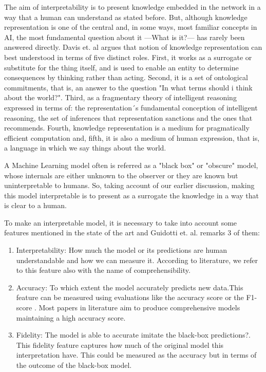 \documentclass[runningheads]{llncs}
\begin{document}
The aim of interpretability is to present knowledge embedded in the network in a way that a human can understand as stated before. But, although knowledge representation is one of the central and, in some ways, most familiar concepts in AI, the most fundamental question about it —What is it?— has rarely been answered directly. Davis et. al \cite{Cercone1987} argues that notion of knowledge representation can best understood in terms of five distinct roles. First, it works as a surrogate or substitute for the thing itself, and is used to enable an entity to determine consequences by thinking rather than acting. Second, it is a set of ontological commitments, that is, an answer to the question "In what terms should i think about the world?". Third, as a fragmentary theory of intelligent reasoning expressed in terms of:  the representation´s fundamental conception of intelligent reasoning, the set of inferences that representation sanctions and the ones that recommends. Fourth, knowledge representation is a medium for pragmatically efficient computation and, fifth, it is also a medium of human expression, that is, a language in which we say things about the world.

A Machine Learning model often is referred as a "black box" or "obscure" model, whose internals are either unknown to the observer or they are known but uninterpretable to humans. So, taking account of our earlier discussion, making this model interpretable is to present as a surrogate the knowledge in a way that is clear to a human.

To make an interpretable model, it is necessary to take into account some features mentioned in the state of the art \cite{Andrews1995} \cite{Doshi-velez2017} \cite{Freitas} and Guidotti et. al. \cite{Guidotti2018} remarks 3 of them:

\begin{enumerate}
    \item Interpretability: How much the model or its predictions are human understandable and how we can measure it. According to literature, we refer to this feature also with the name of comprehensibility.
    \item Accuracy: To which extent the model accurately predicts new data.This feature can be measured using evaluations like the accuracy score or the F1-score \cite{tan2006introduction}. Most papers in literature aim to produce comprehensive models maintaining a high accuracy score. 
    \item Fidelity: The model is able to accurate imitate the black-box predictions?. This fidelity feature captures how much of the original model this interpretation have. This could be measured as the accuracy but in terms of the outcome of the black-box model.
\end{enumerate}
\end{document}
